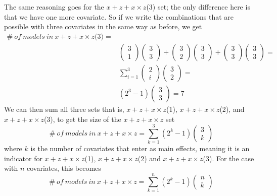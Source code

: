 The same reasoning goes for the $x + z + x \times z$(3) set; the only difference here is that we have one more covariate. So if we write the combinations that are possible with three covariates in the same way as before, we get
\begin{equation*}
\begin{aligned}
\#\ of\ models\ in\ x + z + x \times z\textit{(3)}=\\
&\left( \begin{array}{c}
3 \\ 
1 \end{array}
\right)\left( \begin{array}{c}
3 \\ 
3 \end{array}
\right)+\left( \begin{array}{c}
3 \\ 
2 \end{array}
\right)\left( \begin{array}{c}
3 \\ 
3 \end{array}
\right)+\left( \begin{array}{c}
3 \\ 
3 \end{array}
\right)\left( \begin{array}{c}
3 \\ 
3 \end{array}
\right)= \\
&\sum^3_{i=1}{\left( \begin{array}{c}
2 \\ 
i \end{array}
\right)}\left( \begin{array}{c}
3 \\ 
2 \end{array}
\right)= \\
&\left(2^3-1\right)\left( \begin{array}{c}
3 \\ 
3 \end{array}
\right)=7
\end{aligned}
\end{equation*}
We can then sum all three sets that is, $x + z + x \times z$(1), $x + z + x \times z$(2), and $x + z + x \times z$(3), to get the size of the $x + z + x \times z$ set
\[\#\ of\ models\ in\ x + z + x \times z=\sum^3_{k=1}{(2^k-1)\left( \begin{array}{c}
3 \\ 
k \end{array}
\right)}\]where $k$ is the number of covariates that enter as main effects, meaning it is an indicator for $x + z + x \times z$(1), $x + z + x \times z$(2) and $x + z + x \times z$(3). For the case with $n$ covariates, this becomes
\[\#\ of\ models\ in\ x + z + x \times z=\sum^n_{k=1}{(2^k-1)\left( \begin{array}{c}
n \\ 
k \end{array}
\right)}\] 
